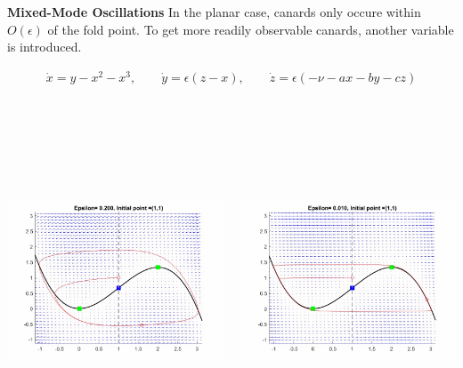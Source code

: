\documentclass[15pt, a0paper, portrait]{tikzposter}
\begin{document}
\block{~}
{\textbf{Mixed-Mode Oscillations}\centering
	In the planar case, canards only occure within $O(\epsilon)$ of the fold point. To get more readily observable canards, another variable is introduced.
	
	\begin{align*} \dot{x} = y-x^2-x^3,\qquad \dot{y} = \epsilon(z-x),\qquad\dot{z}= \epsilon(-\nu-ax-by-cz) \end{align*}
}
\begin{columns}
	{
		
		\begin{tikzfigure}[h!]
			\centering
			\includegraphics[height=10cm,width=13cm]{Posterpic1.jpg}
		\end{tikzfigure}
	}
	{
		\begin{tikzfigure}[h!]
			\centering
			\includegraphics[height=10cm,width=13cm]{Posterpic2.jpg}
	\end{tikzfigure}}
\end{columns}
\end{document}
